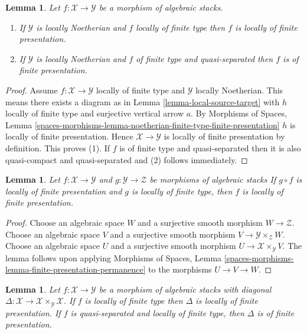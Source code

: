 \documentclass{stacks-project}
\theoremstyle{plain}
\newtheorem{lemma}[subsection]{Lemma}
\theoremstyle{definition}
\theoremstyle{remark}
\numberwithin{equation}{subsection}
\begin{document}
\begin{lemma}
\label{lemma-noetherian-finite-type-finite-presentation}
Let $f : \mathcal{X} \to \mathcal{Y}$ be a morphism of algebraic stacks.
\begin{enumerate}
\item If $\mathcal{Y}$ is locally Noetherian and $f$ locally of finite type
then $f$ is locally of finite presentation.
\item If $\mathcal{Y}$ is locally Noetherian and $f$ of finite type and
quasi-separated then $f$ is of finite presentation.
\end{enumerate}
\end{lemma}

\begin{proof}
Assume $f : \mathcal{X} \to \mathcal{Y}$
locally of finite type and $\mathcal{Y}$ locally Noetherian.
This means there exists a diagram as in
Lemma \ref{lemma-local-source-target}
with $h$ locally of finite type and surjective vertical arrow $a$. By
Morphisms of Spaces, Lemma
\ref{spaces-morphisms-lemma-noetherian-finite-type-finite-presentation}
$h$ is locally of finite presentation.
Hence $\mathcal{X} \to \mathcal{Y}$
is locally of finite presentation by definition.
This proves (1).
If $f$ is of finite type and quasi-separated then it is also
quasi-compact and quasi-separated and (2) follows immediately.
\end{proof}

\begin{lemma}
\label{lemma-finite-presentation-permanence}
Let $f : \mathcal{X} \to \mathcal{Y}$ and
$g : \mathcal{Y} \to \mathcal{Z}$ be morphisms of algebraic stacks
If $g \circ f$ is locally of finite presentation and $g$ is locally of
finite type, then $f$ is locally of finite presentation.
\end{lemma}

\begin{proof}
Choose an algebraic space $W$ and a surjective smooth morphism
$W \to \mathcal{Z}$.
Choose an algebraic space $V$ and a surjective smooth morphism
$V \to \mathcal{Y} \times_\mathcal{Z} W$.
Choose an algebraic space $U$ and a surjective smooth morphism
$U \to \mathcal{X} \times_\mathcal{Y} V$.
The lemma follows upon applying
Morphisms of Spaces, Lemma
\ref{spaces-morphisms-lemma-finite-presentation-permanence}
to the morphisms $U \to V \to W$.
\end{proof}

\begin{lemma}
\label{lemma-diagonal-morphism-finite-type}
Let $f : \mathcal{X} \to \mathcal{Y}$ be a morphism of algebraic stacks
with diagonal
$\Delta : \mathcal{X} \to \mathcal{X} \times_\mathcal{Y} \mathcal{X}$.
If $f$ is locally of finite type then $\Delta$ is
locally of finite presentation. If $f$ is
quasi-separated and locally of finite type, then $\Delta$ is of finite
presentation.
\end{lemma}
\end{document}
